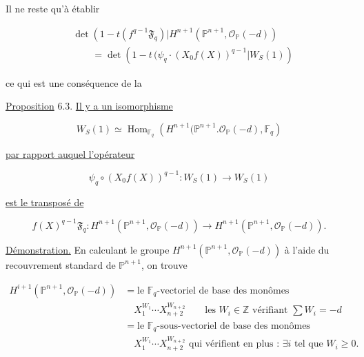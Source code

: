Il ne reste qu'à établir

\begin{equation}\tag{6.2.8}
\begin{aligned}
&\det\!\left(
1-t(f^{q-1}\mathfrak F_q)
\mathrel{\Big|}
H^{n+1}(\mathbb P^{n+1},\mathcal O_{\mathbb P}(-d))
\right.\\
&\qquad=
\det\!\left(
1-t\,(\psi_q\cdot(X_0f(X))^{q-1}
\mathrel{\Big|}W_S(1)
\right)
\end{aligned}
\end{equation}

ce qui est une conséquence de la

\underline{Proposition} 6.3.
\underline{Il y a un isomorphisme}

\begin{equation}\tag{6.3.1}
W_S(1)\simeq
\operatorname{Hom}_{\mathbb F_q}\!\left(
H^{n+1}(\mathbb P^{n+1}.\mathcal O_{\mathbb P}(-d),
\mathbb F_q\right)
\end{equation}

\underline{par rapport auquel l'opérateur}

\begin{equation}\tag{6.3.2}
\psi_q\circ(X_0f(X))^{q-1}:W_S(1)\longrightarrow W_S(1)
\end{equation}


\underline{est le transposé de}

\begin{equation}\tag{6.3.3}
f(X)^{q-1}\mathfrak F_q:
H^{n+1}(\mathbb P^{n+1},\mathcal O_{\mathbb P}(-d))
\longrightarrow
H^{n+1}(\mathbb P^{n+1},\mathcal O_{\mathbb P}(-d)).
\end{equation}

\underline{Démonstration.}
En calculant le groupe
$H^{n+1}(\mathbb P^{n+1},\mathcal O_{\mathbb P}(-d))$ à l'aide du
recouvrement standard de $\mathbb P^{n+1}$, on trouve

\begin{equation}\tag{6.3.4}
\begin{aligned}
H^{i+1}(\mathbb P^{n+1},\mathcal O_{\mathbb P}(-d))
&=\text{le $\mathbb F_q$-vectoriel de base des monômes}\\
&\quad X_1^{W_1}\cdots X_{n+2}^{W_{n+2}}
\qquad\text{les }W_i\in\mathbb Z\text{ vérifiant }\sum W_i=-d\\
&=\text{le $\mathbb F_q$-sous-vectoriel de base des monômes}\\
&\quad X_1^{W_1}\cdots X_{n+2}^{W_{n+2}}
\text{ qui vérifient en plus : }\exists i\text{ tel que }W_i\geq0.
\end{aligned}
\end{equation}

